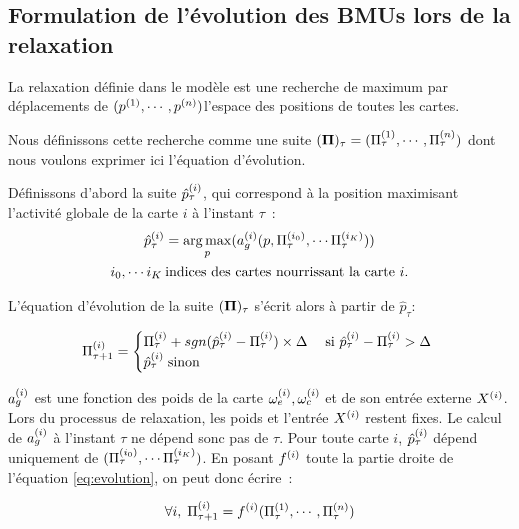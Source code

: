 \documentclass[../main]{subfiles}
\begin{document}
\subsection{Formulation de l'évolution des BMUs lors de la relaxation}\label{sec:formulation_suite}

La relaxation définie dans le modèle est une recherche de maximum par déplacements de $(p^{({1})},\cdots, p^{({n})})$l'espace des positions de toutes les cartes.

Nous définissons cette recherche comme une suite $(\mathbf{\Pi})_\tau = (\Pi^{({1})}_\tau,\cdots,\Pi^{({n})}_\tau)$ dont nous voulons exprimer ici l'équation d'évolution.

Définissons d'abord la suite $\hat{p}^{({i})}_\tau$, qui correspond à la position maximisant l'activité globale de la carte $i$ à l'instant $\tau$~:
\begin{equation}
\begin{gathered}
\hat{p}^{({i})}_{\tau} = \operatorname*{arg\,max}_p(a_g^{({i})}(p,\Pi^{({i_0})}_\tau, \cdots \Pi^{({i_K})}_\tau))\\
 i_0, \cdots i_K \: \text{indices des cartes nourrissant la carte $i$}.
\end{gathered}
\label{eq:pstar}
\end{equation}

L'équation d'évolution de la suite $(\mathbf{\Pi})_\tau$ s'écrit alors à partir de $\hat{p}_\tau$:

\begin{equation}
\Pi^{({i})}_{\tau+1} = 
\begin{cases}
\Pi^{({i})}_{\tau} + sgn(\hat{p}^{({i})}_{\tau} - \Pi^{({i})}_{\tau}) \times \Delta \; & \text{si $\hat{p}^{({i})}_{\tau} - \Pi^{({i})}_{\tau} > \Delta$ } \\
\hat{p}^{({i})}_{\tau} \; \text{sinon}	
\end{cases}
\label{eq:evolution}
\end{equation}

$a_g^{({i})}$ est une fonction des poids de la carte $\omega_{e}^{({i})}, \omega_{c}^{({i})}$ et de son entrée externe $X^{({i})}$. 
Lors du processus de relaxation, les poids et l'entrée $X^{({i})}$ restent fixes. 
Le calcul de $a_g^{({i})}$ à l'instant $\tau$ ne dépend sonc pas de $\tau$.
Pour toute carte $i$, $\hat{p}^{({i})}_{\tau}$ dépend uniquement de $(\Pi^{({i_0})}_\tau, \cdots \Pi^{({i_K})}_\tau)$. 
En posant $f^{({i})}$ toute la partie droite de l'équation \ref{eq:evolution}, on peut donc écrire~:

\begin{equation}
\forall i, \; \Pi^{({i})}_{\tau +1} = f^{({i})}(\Pi^{({1})}_\tau,\cdots,\Pi^{({n})}_\tau)
\label{eq:fonction}
\end{equation}
\end{document}
